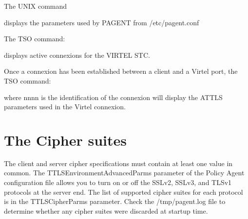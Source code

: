 \documentclass[letterpaper,10pt,english]{sphinxmanual}
\begin{document}
\sphinxAtStartPar
The UNIX command

\begin{sphinxVerbatim}[commandchars=\\\{\}]
\end{sphinxVerbatim}

\sphinxAtStartPar
displays the parameters used by PAGENT from /etc/pagent.conf

\sphinxAtStartPar
The TSO command:\sphinxhyphen{}

\begin{sphinxVerbatim}[commandchars=\\\{\}]
 
\end{sphinxVerbatim}

\sphinxAtStartPar
displays active connexions for the VIRTEL STC.

\sphinxAtStartPar
Once a connexion has been established between a client and a Virtel port, the TSO command:\sphinxhyphen{}

\begin{sphinxVerbatim}[commandchars=\\\{\}]
    
\end{sphinxVerbatim}

\sphinxAtStartPar
where nnnn is the identification of the connexion will display the AT\sphinxhyphen{}TLS parameters used in the Virtel connexion.

\newpage

\ignorespaces 

\section{The Cipher suites}
\label{\detokenize{connectivity_guide:the-cipher-suites}}\label{\detokenize{connectivity_guide:index-160}}
\sphinxAtStartPar
The client and server cipher specifications must contain at least one value in common. The TTLSEnvironmentAdvancedParms parameter of the Policy Agent configuration file allows you to turn on or off the SSLv2, SSLv3, and TLSv1 protocols at the server end. The list of supported cipher suites for each protocol is in the TTLSCipherParms parameter. Check the /tmp/pagent.log file to determine whether any cipher suites were discarded at startup time.
\end{document}
